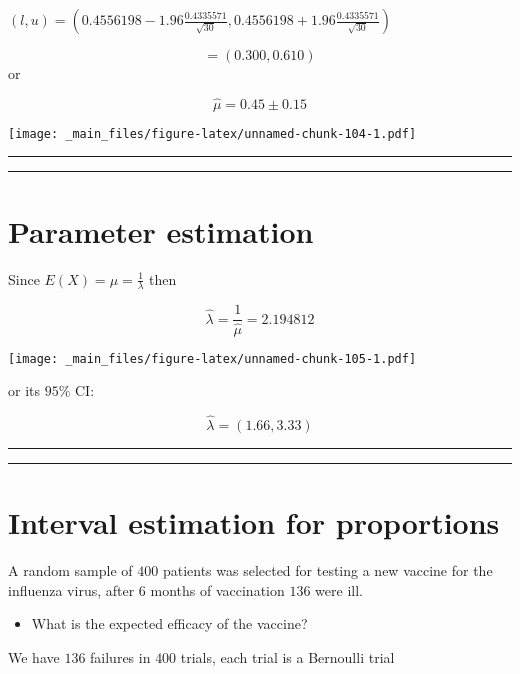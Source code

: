 \documentclass[
]{book}
\providecommand{\tightlist}{%
  \setlength{\itemsep}{0pt}\setlength{\parskip}{0pt}}
\begin{document}
\((l,u)=(0.4556198-1.96\frac{0.4335571}{\sqrt{30}}, 0.4556198+1.96\frac{0.4335571}{\sqrt{30}})\)

\[=(0.300,0.610)\]
or

\[\hat{\mu}=0.45 \pm 0.15\]

\texttt{[image: \_main\_files/figure-latex/unnamed-chunk-104-1.pdf]}

\begin{center}\rule{0.5\linewidth}{0.5pt}\end{center}

\begin{center}\rule{0.5\linewidth}{0.5pt}\end{center}

\hypertarget{parameter-estimation}{%
\section{Parameter estimation}\label{parameter-estimation}}

Since \(E(X)=\mu=\frac{1}{\lambda}\) then

\[\hat{\lambda}=\frac{1}{\hat{\mu}}=2.194812\]

\texttt{[image: \_main\_files/figure-latex/unnamed-chunk-105-1.pdf]}

or its \(95\%\) CI:

\[\hat{\lambda}= (1.66, 3.33) \]

\begin{center}\rule{0.5\linewidth}{0.5pt}\end{center}

\begin{center}\rule{0.5\linewidth}{0.5pt}\end{center}

\hypertarget{interval-estimation-for-proportions}{%
\section{Interval estimation for proportions}\label{interval-estimation-for-proportions}}

A random sample of \(400\) patients was selected for testing a new vaccine for the influenza virus, after \(6\) months of vaccination \(136\) were ill.~

\begin{itemize}
\tightlist
\item
  What is the expected efficacy of the vaccine?
\end{itemize}

We have \(136\) failures in \(400\) trials, each trial is a
Bernoulli trial
\end{document}
